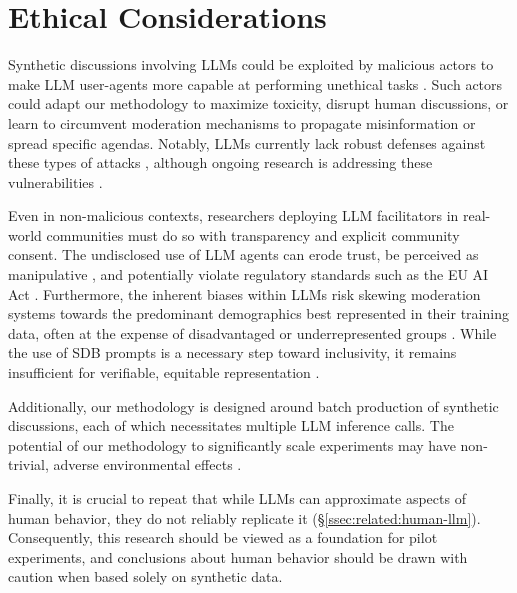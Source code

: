 %
\section{Ethical Considerations}
\label{sec:ethical}

Synthetic discussions involving \acp{LLM} could be exploited by malicious actors to make \ac{LLM} user-agents more capable at performing unethical tasks \cite{majumdar_2024_nefarious, MARULLI20245340}. Such actors could adapt our methodology to  maximize toxicity, disrupt human discussions, or learn to circumvent moderation mechanisms to propagate misinformation or spread specific agendas. Notably, \acp{LLM} currently lack robust defenses against these types of attacks \cite{li_2025_vulnerable}, although ongoing research is addressing these vulnerabilities \cite{wang_2025_risk}.

Even in non-malicious contexts, researchers deploying \ac{LLM} facilitators in real-world communities must do so with transparency and explicit community consent. The undisclosed use of \ac{LLM} agents can erode trust, be perceived as manipulative \cite{retraction_watch}, and potentially violate regulatory standards such as the EU AI Act \cite{eu_ai_act_2024}. Furthermore, the inherent biases within \acp{LLM} risk skewing moderation systems towards the predominant demographics best represented in their training data, often at the expense of disadvantaged or underrepresented groups \cite{rossi_2024, anthis_2025, burton2024large}. While the use of \ac{SDB} prompts is a necessary step toward inclusivity, it remains insufficient for verifiable, equitable representation \cite{rossi_2024}.

Additionally, our methodology is designed around batch production of synthetic discussions, each of which necessitates multiple \ac{LLM} inference calls. The potential of our methodology to significantly scale experiments may have non-trivial, adverse environmental effects \cite{ding_2024_sustainable, Ren2024}. 

Finally, it is crucial to repeat that while \acp{LLM} can approximate aspects of human behavior, they do not reliably replicate it (\S\ref{ssec:related:human-llm}). Consequently, this research should be viewed as a foundation for pilot experiments, and conclusions about human behavior should be drawn with caution when based solely on synthetic data.